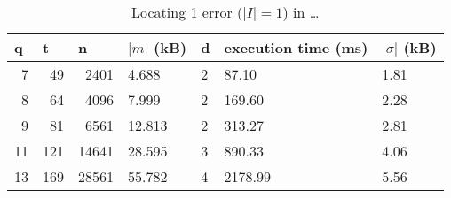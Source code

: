 \begin{table}[ht]
\centering
\begin{tabular}{rrrllll}
\hline
\multicolumn{1}{|l|}{\textbf{q}} & \multicolumn{1}{l|}{\textbf{t}} & \multicolumn{1}{l|}{\textbf{n}} & \multicolumn{1}{l|}{\textbf{$|m|$ (kB)}} & \multicolumn{1}{l|}{\textbf{d}} & \multicolumn{1}{l|}{\textbf{execution time (ms)}} & \multicolumn{1}{l|}{\textbf{$|\sigma|$ (kB)}} \\ \hline
7                                & 49                              & 2401                            & 4.688                                  & 2                               & 87.10                                             & 1.81                                                       \\
8                                & 64                              & 4096                            & 7.999                                  & 2                               & 169.60                                            & 2.28                                                       \\
9                                & 81                              & 6561                            & 12.813                                 & 2                               & 313.27                                            & 2.81                                                       \\
11                               & 121                             & 14641                           & 28.595                                 & 3                               & 890.33                                            & 4.06                                                       \\
13                               & 169                             & 28561                           & 55.782                                 & 4                               & 2178.99                                           & 5.56                                                      
\end{tabular}
    \caption{Locating 1 error ($|I| = 1$) in \dots}
    \label{table:locate-1-error-same-k}
\end{table}